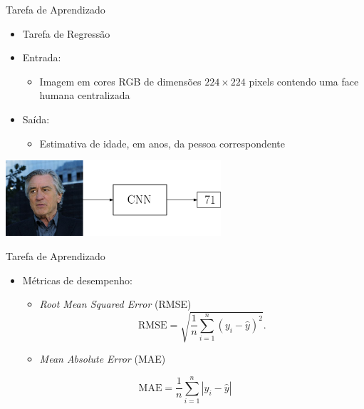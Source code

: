 \begin{frame}{Tarefa de Aprendizado}
\begin{itemize}
  \item \alert{Tarefa de Regressão}
  \item \alert{Entrada}:
  \begin{itemize}
    \item Imagem em cores RGB de dimensões $224 \times 224$ pixels contendo uma face humana centralizada
  \end{itemize}
   \item \alert{Saída}:
   \begin{itemize}
        \item Estimativa de idade, em anos, da pessoa correspondente
   \end{itemize}
\end{itemize}
\begin{center}
     \includegraphics[width=0.60\textwidth]{img/deniro_cnn}
\end{center}
\end{frame}

\begin{frame}{Tarefa de Aprendizado}
     \begin{itemize}
          \item Métricas de desempenho:
          \begin{itemize}
            \item \emph{Root Mean Squared Error} (RMSE)
     \begin{equation}\label{eq:rmse}
          \textrm{RMSE} = \sqrt{\frac{1}{n} \sum_{i=1}^n (y_i - \hat{y})^2}.
     \end{equation}
           \item \emph{Mean Absolute Error} (MAE)
         \end{itemize}
    \end{itemize}
    \begin{equation}\label{eq:mae}
         \textrm{MAE} = \frac{1}{n}\sum_{i=1}^{n} |y_i - \hat{y}|
    \end{equation}
  \end{frame}

